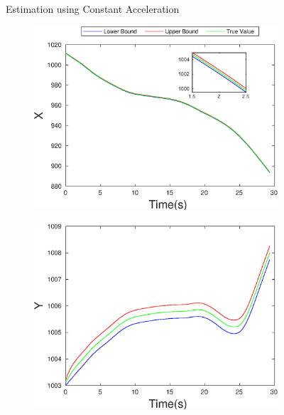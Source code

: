 \begin{figure}[h]
\begin{subfigure}{.5\linewidth}
\end{subfigure}
\caption{Estimation using Constant Acceleration}
\end{figure}

\begin{figure}[h]
\begin{subfigure}{.5\linewidth}
\centering
\includegraphics[width=\linewidth]{figures/Frad/s3pmSMX}
\end{subfigure}
\begin{subfigure}{.5\linewidth}
\centering
\includegraphics[width=\linewidth]{figures/Frad/s3pmSMY}
\end{subfigure}
\begin{subfigure}{.5\linewidth}
\centering

\end{subfigure}
\end{figure}
